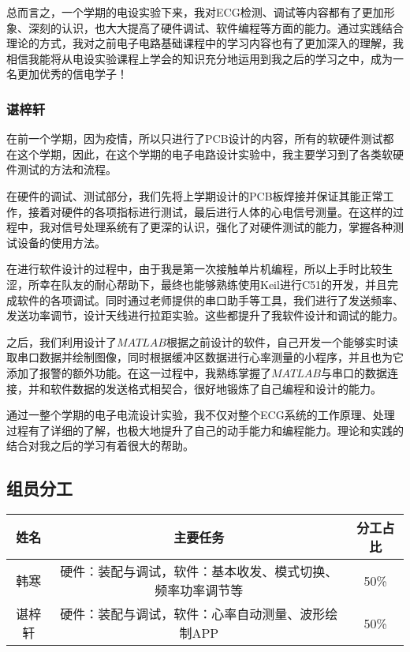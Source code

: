 \documentclass{zjureport}
\begin{document}
	总而言之，一个学期的电设实验下来，我对ECG检测、调试等内容都有了更加形象、深刻的认识，也大大提高了硬件调试、软件编程等方面的能力。通过实践结合理论的方式，我对之前电子电路基础课程中的学习内容也有了更加深入的理解，我相信我能将从电设实验课程上学会的知识充分地运用到我之后的学习之中，成为一名更加优秀的信电学子！
	
	\subsubsection{谌梓轩}
	
	在前一个学期，因为疫情，所以只进行了PCB设计的内容，所有的软硬件测试都在这个学期，因此，在这个学期的电子电路设计实验中，我主要学习到了各类软硬件测试的方法和流程。
	
	在硬件的调试、测试部分，我们先将上学期设计的PCB板焊接并保证其能正常工作，接着对硬件的各项指标进行测试，最后进行人体的心电信号测量。在这样的过程中，我对信号处理系统有了更深的认识，强化了对硬件测试的能力，掌握各种测试设备的使用方法。
	
	在进行软件设计的过程中，由于我是第一次接触单片机编程，所以上手时比较生涩，所幸在队友的耐心帮助下，最终也能够熟练使用Keil进行C51的开发，并且完成软件的各项调试。同时通过老师提供的串口助手等工具，我们进行了发送频率、发送功率调节，设计天线进行拉距实验。这些都提升了我软件设计和调试的能力。
	
	之后，我们利用设计了$MATLAB$根据之前设计的软件，自己开发一个能够实时读取串口数据并绘制图像，同时根据缓冲区数据进行心率测量的小程序，并且也为它添加了报警的额外功能。在这一过程中，我熟练掌握了$MATLAB$与串口的数据连接，并和软件数据的发送格式相契合，很好地锻炼了自己编程和设计的能力。
	
	通过一整个学期的电子电流设计实验，我不仅对整个ECG系统的工作原理、处理过程有了详细的了解，也极大地提升了自己的动手能力和编程能力。理论和实践的结合对我之后的学习有着很大的帮助。
	
	
	
	\subsection{组员分工}
	
	\begin{table}[!ht]
		\centering
		\begin{tabular}{|c|c|c|}
			\hline
			姓名 & 主要任务 & 分工占比 \\ \hline
			韩寒 & 硬件：装配与调试，软件：基本收发、模式切换、频率功率调节等 & 50\%  \\ \hline
			谌梓轩 & 硬件：装配与调试，软件：心率自动测量、波形绘制APP & 50\%  \\ \hline
			
		\end{tabular}
	\end{table}
	
\end{document}

